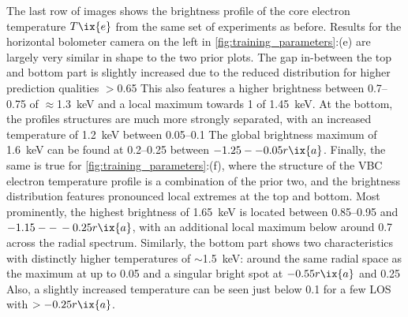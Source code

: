             The last row of images shows the brightness profile of the core electron temperature $T\ix{e}$ from the same set of experiments as before. Results for the horizontal bolometer camera on the left in \cref{fig:training_parameters}:(e) are largely very similar in shape to the two prior plots. The gap in-between the top and bottom part is slightly increased due to the reduced distribution for higher prediction qualities $>$\SI{0.65}{\arbitraryunit} This also features a higher brightness between \SIrange{0.7}{0.75}{\arbitraryunit} of $\approx$\SI{1.3}{\kilo\electronvolt} and a local maximum towards \SI{1}{\arbitraryunit} of \SI{1.45}{\kilo\electronvolt}. At the bottom, the profiles structures are much more strongly separated, with an increased temperature of \SI{1.2}{\kilo\electronvolt} between \SIrange{0.05}{0.1}{\arbitraryunit} The global brightness maximum of \SI{1.6}{\kilo\electronvolt} can be found at \SIrange{0.2}{0.25}{\arbitraryunit} between $-1.25--0.05r\ix{a}$. Finally, the same is true for \cref{fig:training_parameters}:(f), where the structure of the VBC electron temperature profile is a combination of the prior two, and the brightness distribution features pronounced local extremes at the top and bottom. Most prominently, the highest brightness of \SI{1.65}{\kilo\electronvolt} is located between \SIrange{0.85}{0.95}{\arbitraryunit} and $-1.15--\,-0.25r\ix{a}$, with an additional local maximum below around \SI{0.7}{\arbitraryunit} across the radial spectrum. Similarly, the bottom part shows two characteristics with distinctly higher temperatures of $\sim$\SI{1.5}{\kilo\electronvolt}: around the same radial space as the maximum at up to \SI{0.05}{\arbitraryunit} and a singular bright spot at $-0.55r\ix{a}$ and \SI{0.25}{\arbitraryunit} Also, a slightly increased temperature can be seen just below \SI{0.1}{\arbitraryunit} for a few LOS with $>-0.25r\ix{a}$.\\%
